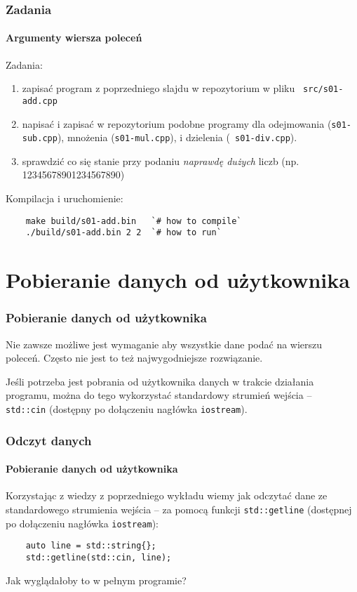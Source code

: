 \documentclass[aspectratio=169]{beamer}
\begin{document}
\begin{frame}[fragile]
    \frametitle{Zadania}
    \framesubtitle{Argumenty wiersza poleceń}

    Zadania:
    \label{lecture_exercise_2}

    \begin{enumerate}
    \item zapisać program z poprzedniego slajdu w repozytorium w pliku {\tt
        src/s01-add.cpp}
    \item napisać i zapisać w repozytorium podobne programy dla odejmowania
        ({\tt s01-sub.cpp}), mnożenia ({\tt s01-mul.cpp}), i dzielenia ({\tt
        s01-div.cpp}).
    \item sprawdzić co się stanie przy podaniu \emph{naprawdę dużych} liczb (np.
        12345678901234567890)
    \end{enumerate}

    Kompilacja i uruchomienie:
    {\footnotesize
    \begin{lstlisting}
    make build/s01-add.bin   `# how to compile`
    ./build/s01-add.bin 2 2  `# how to run`
    \end{lstlisting}}
\end{frame}

\section{Pobieranie danych od użytkownika}

\begin{frame}
    \frametitle{Pobieranie danych od użytkownika}

    Nie zawsze możliwe jest wymaganie aby wszystkie dane podać na wierszu
    poleceń. Często nie jest to też najwygodniejsze rozwiązanie.

    Jeśli potrzeba jest pobrania od użytkownika danych w trakcie działania
    programu, można do tego wykorzystać standardowy strumień wejścia -- {\tt
    std::cin} (dostępny po dołączeniu nagłówka {\tt iostream}).
\end{frame}

\begin{frame}[fragile]
    \frametitle{Odczyt danych}
    \framesubtitle{Pobieranie danych od użytkownika}

    Korzystając z wiedzy z poprzedniego wykładu wiemy jak odczytać dane ze
    standardowego strumienia wejścia -- za pomocą funkcji {\tt std::getline}
    (dostępnej po dołączeniu nagłówka {\tt iostream}):

    \begin{lstlisting}
    auto line = std::string{};
    std::getline(std::cin, line);
    \end{lstlisting}

    Jak wyglądałoby to w pełnym programie?
\end{frame}
\end{document}
